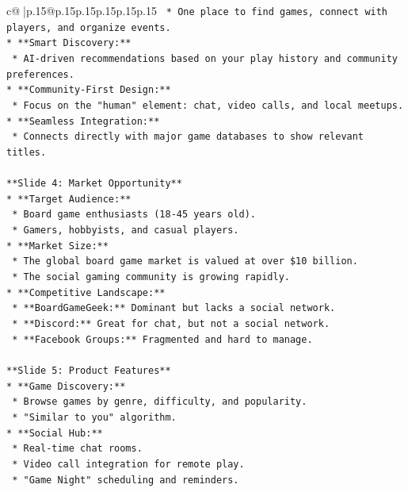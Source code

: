 \documentclass{article}
\begin{document}
{\begin{supertabular}{c@{$\;$}|p{.15\linewidth}@{}p{.15\linewidth}p{.15\linewidth}p{.15\linewidth}p{.15\linewidth}p{.15\linewidth}}
{{{\texttt{    *   One place to find games, connect with players, and organize events.} \\
\texttt{*   **Smart Discovery:**} \\
\texttt{    *   AI{-}driven recommendations based on your play history and community preferences.} \\
\texttt{*   **Community{-}First Design:**} \\
\texttt{    *   Focus on the "human" element: chat, video calls, and local meetups.} \\
\texttt{*   **Seamless Integration:**} \\
\texttt{    *   Connects directly with major game databases to show relevant titles.} \\
\\ 
\texttt{**Slide 4: Market Opportunity**} \\
\texttt{*   **Target Audience:**} \\
\texttt{    *   Board game enthusiasts (18{-}45 years old).} \\
\texttt{    *   Gamers, hobbyists, and casual players.} \\
\texttt{*   **Market Size:**} \\
\texttt{    *   The global board game market is valued at over \$10 billion.} \\
\texttt{    *   The social gaming community is growing rapidly.} \\
\texttt{*   **Competitive Landscape:**} \\
\texttt{    *   **BoardGameGeek:** Dominant but lacks a social network.} \\
\texttt{    *   **Discord:** Great for chat, but not a social network.} \\
\texttt{    *   **Facebook Groups:** Fragmented and hard to manage.} \\
\\ 
\texttt{**Slide 5: Product Features**} \\
\texttt{*   **Game Discovery:**} \\
\texttt{    *   Browse games by genre, difficulty, and popularity.} \\
\texttt{    *   "Similar to you" algorithm.} \\
\texttt{*   **Social Hub:**} \\
\texttt{    *   Real{-}time chat rooms.} \\
\texttt{    *   Video call integration for remote play.} \\
\texttt{    *   "Game Night" scheduling and reminders.} \\
}}}
\end{supertabular}}
\end{document}
